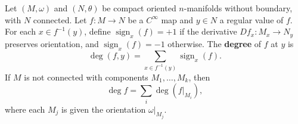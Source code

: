 Let $(M, \omega)$ and $(N, \theta)$ be compact oriented $n$-manifolds without boundary, with $N$ connected. Let $f: M \to N$ be a $C^\infty$ map and $y \in N$ a regular value of $f$. For each $x \in f^{-1}(y)$, define $\operatorname{sign}_x(f) = +1$ if the derivative $Df_x: M_x \to N_y$ preserves orientation, and $\operatorname{sign}_x(f) = -1$ otherwise. The \textbf{degree} of $f$ at $y$ is
$$
\deg(f, y) = \sum_{x \in f^{-1}(y)} \operatorname{sign}_x(f).
$$
If $M$ is not connected with components $M_1, \ldots, M_k$, then
$$
\deg f = \sum_i \deg(f|_{M_i}),
$$
where each $M_j$ is given the orientation $\omega|_{M_j}$.
